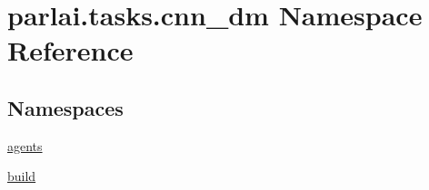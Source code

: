 \hypertarget{namespaceparlai_1_1tasks_1_1cnn__dm}{}\section{parlai.\+tasks.\+cnn\+\_\+dm Namespace Reference}
\label{namespaceparlai_1_1tasks_1_1cnn__dm}
\subsection*{Namespaces}
\begin{DoxyCompactItemize}
\item 
 \hyperlink{namespaceparlai_1_1tasks_1_1cnn__dm_1_1agents}{agents}
\item 
 \hyperlink{namespaceparlai_1_1tasks_1_1cnn__dm_1_1build}{build}
\end{DoxyCompactItemize}
